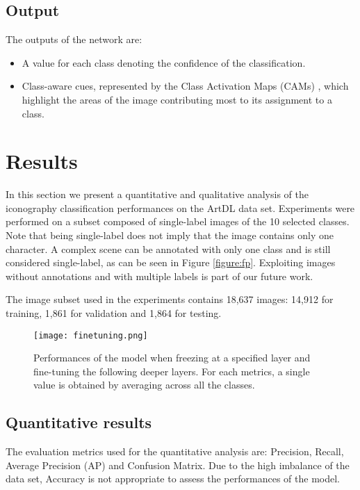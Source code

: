 \documentclass[acmlarge]{acmart}
\begin{document}
\subsection{Output}
The outputs of the network are:
\begin{itemize}
    \item A value for each class denoting  the confidence of the classification.
    \item Class-aware cues, represented by the Class Activation Maps (CAMs) \cite{zhou2016learning}, which highlight the areas of the image contributing most to its  assignment to a class.
\end{itemize}


 \section{Results}\label{sec:results}

In this section we present a quantitative and qualitative analysis of the iconography classification performances on the ArtDL data set. Experiments were performed on a subset composed of  single-label images of the 10 selected classes. Note that being single-label does not imply that the image contains only one character. A complex scene can be annotated  with only  one class and is still considered single-label, as can be seen in Figure \ref{figure:fp}. Exploiting images without annotations and with multiple labels  is part of our future work.

The image subset used in the experiments contains 18,637 images: 14,912 for training, 1,861 for validation and 1,864 for testing.

\begin{figure}[t]
    \centering
    \texttt{[image: finetuning.png]}
    \caption{Performances of the model when freezing at a specified layer and fine-tuning the following deeper layers. For each metrics, a single value is obtained by averaging across all the  classes. }\label{figure:finetuning}
\end{figure}

\subsection{Quantitative results} \label{sec:quantitative}
The evaluation metrics used for the quantitative analysis are: Precision, Recall, Average Precision (AP) and Confusion Matrix. Due to the high imbalance of the data set, Accuracy is not  appropriate to assess the performances of the model.
\end{document}
